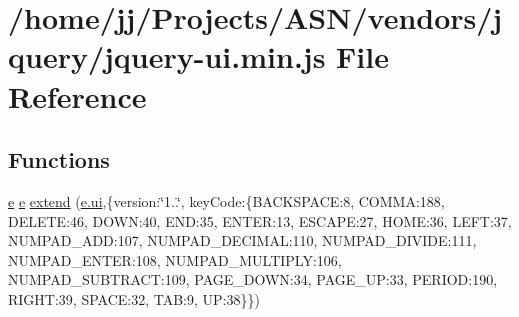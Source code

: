 \hypertarget{jquery-ui_8min_8js}{}\section{/home/jj/\+Projects/\+A\+S\+N/vendors/jquery/jquery-\/ui.min.\+js File Reference}
\label{jquery-ui_8min_8js}
\subsection*{Functions}
\begin{DoxyCompactItemize}
\item 
\hyperlink{jquery-ui_8min_8js_abea95a4e94bc6f4151d5683d4c12c3f4}{e} \hyperlink{jquery-ui_8min_8js_abea95a4e94bc6f4151d5683d4c12c3f4}{e} \hyperlink{jquery-ui_8min_8js_aceeaa2080d5a7df0cc8b259774f5a96a}{extend} (\hyperlink{jquery-ui_8min_8js_a8ebc3a47bff7b1c2623695f3db4c0761}{e.\+ui},\{version\+:\char`\"{}1..\char`\"{}, key\+Code\+:\{B\+A\+C\+K\+S\+P\+A\+C\+E\+:8, C\+O\+M\+M\+A\+:188, D\+E\+L\+E\+T\+E\+:46, D\+O\+W\+N\+:40, E\+N\+D\+:35, E\+N\+T\+E\+R\+:13, E\+S\+C\+A\+P\+E\+:27, H\+O\+M\+E\+:36, L\+E\+F\+T\+:37, N\+U\+M\+P\+A\+D\+\_\+\+A\+D\+D\+:107, N\+U\+M\+P\+A\+D\+\_\+\+D\+E\+C\+I\+M\+A\+L\+:110, N\+U\+M\+P\+A\+D\+\_\+\+D\+I\+V\+I\+D\+E\+:111, N\+U\+M\+P\+A\+D\+\_\+\+E\+N\+T\+E\+R\+:108, N\+U\+M\+P\+A\+D\+\_\+\+M\+U\+L\+T\+I\+P\+L\+Y\+:106, N\+U\+M\+P\+A\+D\+\_\+\+S\+U\+B\+T\+R\+A\+C\+T\+:109, P\+A\+G\+E\+\_\+\+D\+O\+W\+N\+:34, P\+A\+G\+E\+\_\+\+U\+P\+:33, P\+E\+R\+I\+O\+D\+:190, R\+I\+G\+H\+T\+:39, S\+P\+A\+C\+E\+:32, T\+A\+B\+:9, U\+P\+:38\}\})
\item 

\end{DoxyCompactItemize}
